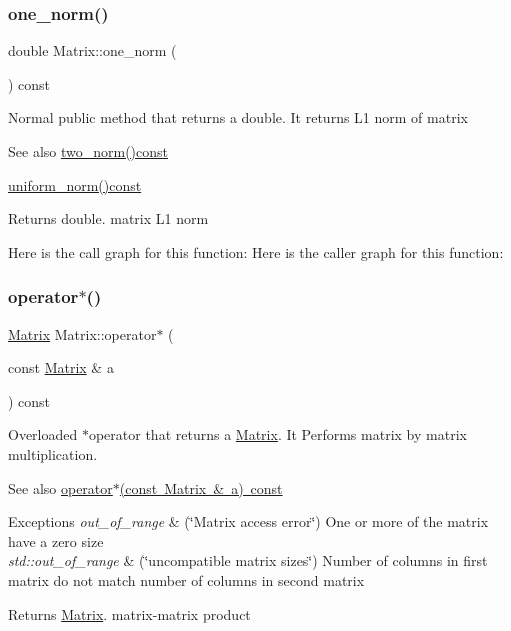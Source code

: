 \subsubsection{\texorpdfstring{one\+\_\+norm()}{one\_norm()}}
{\footnotesize\ttfamily double Matrix\+::one\+\_\+norm (\begin{DoxyParamCaption}{ }\end{DoxyParamCaption}) const}

Normal public method that returns a double. It returns L1 norm of matrix \begin{DoxySeeAlso}{See also}
\mbox{\hyperlink{class_matrix_aac496af05ec7aa26afc2b9c6d0ab8b66}{two\+\_\+norm()const}} 

\mbox{\hyperlink{class_matrix_a43066c7fe6418aad40170b85415063e8}{uniform\+\_\+norm()const}} 
\end{DoxySeeAlso}
\begin{DoxyReturn}{Returns}
double. matrix L1 norm 
\end{DoxyReturn}
Here is the call graph for this function\+:
Here is the caller graph for this function\+:
\mbox{\label{class_matrix_aaa40c78e6b3bb5bbf572d35612dbf6a7}} 
\subsubsection{\texorpdfstring{operator$\ast$()}{operator*()}}
{\footnotesize\ttfamily \mbox{\hyperlink{class_matrix}{Matrix}} Matrix\+::operator$\ast$ (\begin{DoxyParamCaption}\item[{const \mbox{\hyperlink{class_matrix}{Matrix}} \&}]{a }\end{DoxyParamCaption}) const}

Overloaded $\ast$operator that returns a \mbox{\hyperlink{class_matrix}{Matrix}}. It Performs matrix by matrix multiplication. \begin{DoxySeeAlso}{See also}
\mbox{\hyperlink{class_matrix_aaa40c78e6b3bb5bbf572d35612dbf6a7}{operator$\ast$(const Matrix \& a) const}} 
\end{DoxySeeAlso}

\begin{DoxyExceptions}{Exceptions}
{\em out\+\_\+of\+\_\+range} & (\char`\"{}\+Matrix access error\char`\"{}) One or more of the matrix have a zero size \\
\hline
{\em std\+::out\+\_\+of\+\_\+range} & (\char`\"{}uncompatible matrix sizes\char`\"{}) Number of columns in first matrix do not match number of columns in second matrix \\
\hline
\end{DoxyExceptions}
\begin{DoxyReturn}{Returns}
\mbox{\hyperlink{class_matrix}{Matrix}}. matrix-\/matrix product 
\end{DoxyReturn}

